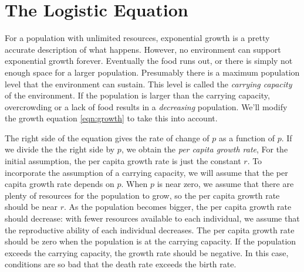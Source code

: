 \newpage

\section{The Logistic Equation}

For a population with unlimited resources, exponential growth
is a pretty accurate description of what happens.
However, no environment can support exponential growth forever.
Eventually the food runs out, or there is simply not enough space
for a larger population.
Presumably there is a maximum population level that the environment
can sustain.  This level is called the
\emph{carrying capacity}
of the environment. If the population is larger than the
carrying capacity, overcrowding or a lack of food results in a
\emph{decreasing} population.
We'll modify the growth equation
\eqref{eqn:growth} to take this into account.

The right side of the equation gives the rate of change of $p$
as a function of $p$.
If we divide the the right side by $p$, we obtain the
\emph{per capita growth rate},
For the initial assumption,
the per capita growth rate  is just the constant $r$.
To incorporate the assumption of a carrying capacity, we will assume that the
per capita growth rate depends on $p$.
When $p$ is near zero, we assume that there
are plenty of resources for the population to grow, so the
per capita growth rate should be
near $r$.  As the population becomes bigger, the per capita growth rate
should decrease: with fewer resources available to each individual,
we assume that the reproductive ability of each individual decreases.
The per capita growth rate
should be zero when the population is at the carrying capacity.
If the population exceeds the carrying capacity, the growth rate should
be negative. In this case, conditions are so bad that the death rate
exceeds the birth rate.

